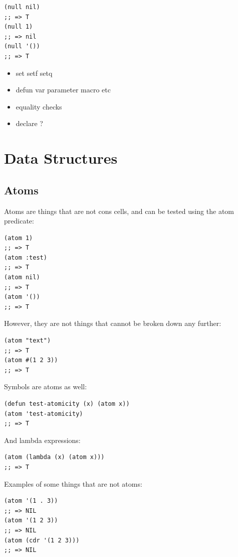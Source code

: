 \documentclass[11pt]{article}
\begin{document}
\begin{verbatim}
(null nil)
;; => T
(null 1)
;; => nil
(null '())
;; => T
\end{verbatim}

\begin{itemize}
\item set setf setq
\item defun var parameter macro etc
\item equality checks
\item declare ?
\end{itemize}

\section{Data Structures}
\label{sec-5}
\subsection{Atoms}
\label{sec-5-1}
Atoms are things that are not cons cells, and can be tested using
the atom predicate:

\begin{verbatim}
(atom 1)
;; => T
(atom :test)
;; => T
(atom nil)
;; => T
(atom '())
;; => T
\end{verbatim}

However, they are not things that cannot be broken down any further:

\begin{verbatim}
(atom "text")
;; => T
(atom #(1 2 3))
;; => T
\end{verbatim}

Symbols are atoms as well:

\begin{verbatim}
(defun test-atomicity (x) (atom x))
(atom 'test-atomicity)
;; => T
\end{verbatim}

And lambda expressions:

\begin{verbatim}
(atom (lambda (x) (atom x)))
;; => T
\end{verbatim}

Examples of some things that are not atoms:

\begin{verbatim}
(atom '(1 . 3))
;; => NIL
(atom '(1 2 3))
;; => NIL
(atom (cdr '(1 2 3)))
;; => NIL
\end{verbatim}
\end{document}

